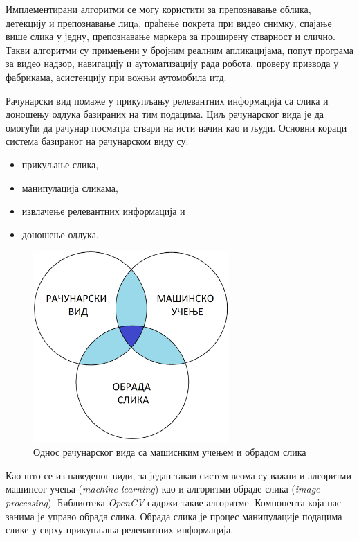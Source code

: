 \documentclass[11pt,a4paper,serbian,oneside]{book}
\begin{document}
Имплементирани алгоритми се могу користити за  препознавање облика, детекцију и препознавање лицa, праћење покрета при видео снимку, спајање више слика у једну, пре\-по\-зна\-ва\-ње маркера за проширену стварност и слично. Такви алгоритми су примењени у бројним реалним апликацијама, попут програма за видео надзор, навигацију и ауто\-ма\-ти\-за\-ци\-ју рада робота, проверу призвода у фабрикама, асистенцију при вожњи аутомобила итд.

Рачунарски вид помаже у прикупљању релевантних информација са слика и доношењу одлука базираних на тим подацима. Циљ рачунарског вида је да омогући да рачунар посматра ствари на исти начин као и људи. Основни кораци система базираног на ра\-чу\-нар\-ском виду су:

\begin{itemize} %
  \item прикуљање слика,
  \item манипулација сликама,
  \item извлачење релевантних информација и
  \item доношење одлука.
\end{itemize}

\begin{figure}[h]
\begin{center}
\includegraphics[width=75mm]{images/cv.png}
\end{center}
\caption{Однос рачунарског вида са машиснким учењем и обрадом слика}
\label{fig:cv}
\end{figure}

Као што се из наведеног види, за један такав систем веома су важни и алгоритми машинсог учења (\textit{machine learning}) као и алгоритми обраде слика (\textit{image processing}). Би\-бли\-о\-те\-ка \textit{OpenCV} садржи такве алгоритме. Компонента која нас занима је управо обрада слика. Обрада слика је процес манипулације подацима слике у сврху прикупљања ре\-ле\-ван\-тних информација. 
\end{document}
